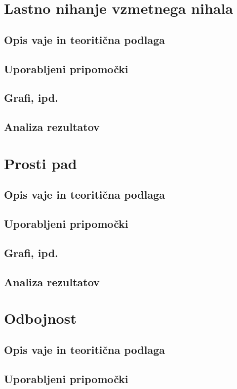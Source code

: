 \documentclass[12pt]{article}
\begin{document}
\section{Lastno nihanje vzmetnega nihala}
    \subsection*{Opis vaje in teoritična podlaga}
    \subsection*{Uporabljeni pripomočki}
    \subsection*{Grafi, ipd.}
    \subsection*{Analiza rezultatov}

\newpage
\section{Prosti pad}
    \subsection*{Opis vaje in teoritična podlaga}
    \subsection*{Uporabljeni pripomočki}
    \subsection*{Grafi, ipd.}
    \subsection*{Analiza rezultatov}

\newpage
\section{Odbojnost}
    \subsection*{Opis vaje in teoritična podlaga}
    \subsection*{Uporabljeni pripomočki}
\end{document}
